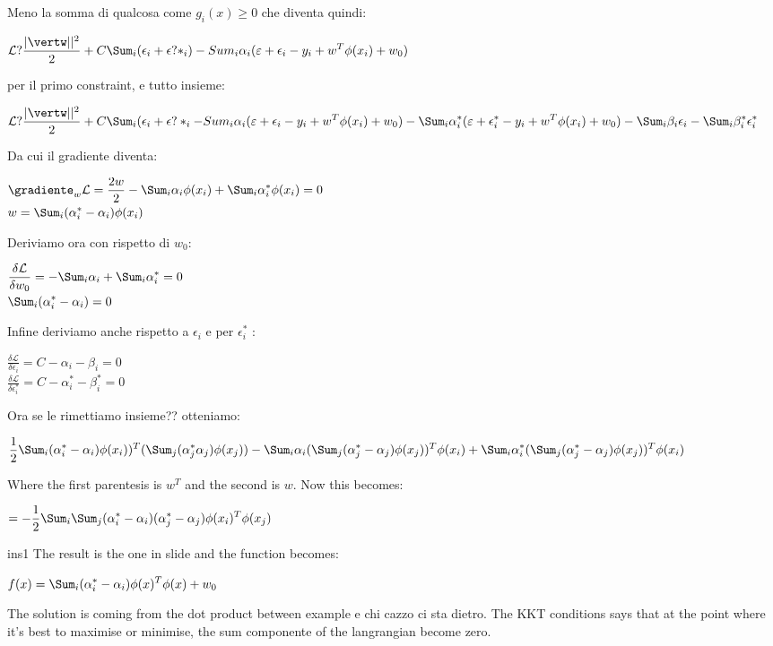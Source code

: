Meno la somma di qualcosa come $g_i(x)\geq 0$ che diventa quindi:
\begin{center}
	$\displaystyle \mathcal{L}?\frac{\vert\vertw\vert\vert^2}{2}+C\Sum_i(\epsilon_i+\epsilon?*_i)-Sum_i\alpha_i(\varepsilon+\epsilon_i-y_i+w^T\phi(x_i)+w_0)$
\end{center}
per il primo constraint, e tutto insieme:
\begin{center}
	$\displaystyle \mathcal{L}?\frac{\vert\vertw\vert\vert^2}{2}+C\Sum_i(\epsilon_i+\epsilon?*_i-Sum_i\alpha_i(\varepsilon+\epsilon_i-y_i+w^T\phi(x_i)+w_0)-\Sum_i\alpha_i^*(\varepsilon+\epsilon_i^*-y_i+w^T\phi(x_i)+w_0)-\Sum_i\beta_i\epsilon_i-\Sum_i\beta_i^*\epsilon^*_i$
\end{center}
Da cui il gradiente diventa:
\begin{center}
	$\displaystyle \gradiente_w\mathcal{L}=\frac{2w}{2}-\Sum_i\alpha_i\phi(x_i)+\Sum_i\alpha_i^*\phi(x_i)=0$\\
	$\displaystyle w=\Sum_i(\alpha^*_i-\alpha_i)\phi(x_i)$
\end{center}
Deriviamo ora con rispetto di $w_0$:
\begin{center}
	$\displaystyle \frac{\delta\mathcal{L}}{\delta w_0}=-\Sum_i\alpha_i+\Sum_i\alpha_i^*=0$\\
	$\displaystyle \Sum_i(\alpha_i^*-\alpha_i)=0$
\end{center}
Infine deriviamo anche rispetto a $\epsilon_i$ e per $\epsilon_i^*$ :
\begin{center}
	$\displaystyle \frac{\delta\mathcal{L}}{\delta \epsilon_i}=C-\alpha_i-\beta_i=0$\\
	$\displaystyle \frac{\delta\mathcal{L}}{\delta \epsilon_i^*}=C-\alpha_i^*-\beta_i^*=0$\\
\end{center}
Ora se le rimettiamo insieme?? otteniamo:
\begin{center}
	$\displaystyle \frac{1}{2}\Sum_i(\alpha^*_i-\alpha_i)\phi(x_i))^T(\Sum_j(\alpha_j^*\alpha_j)\phi(x_j))-\Sum_i\alpha_i(\Sum_j(\alpha_j^*-\alpha_j)\phi(x_j))^T\phi(x_i)+\Sum_i\alpha_i^*(\Sum_j(\alpha_j^*-\alpha_j)\phi(x_j))^T\phi(x_i)$
\end{center}
Where the first parentesis is $w^T$ and the second is $w$. Now this becomes:
\begin{center}
	$\displaystyle =-\frac{1}{2}\Sum_i\Sum_j(\alpha^*_i-\alpha_i)(\alpha_j^*-\alpha_j)\phi(x_i)^T\phi(x_j)$
\end{center}
ins{1} \newline
The result is the one in slide and the function becomes:
\begin{center}
	$\displaystyle f(x)=\Sum_i(\alpha_i^*-\alpha_i)\phi(x)^T\phi(x)+w_0$
\end{center}
The solution is coming from the dot product between example e chi cazzo ci sta dietro.\newline
The KKT conditions says that at the point where it's best to maximise or minimise, the sum componente of the langrangian become zero. 
